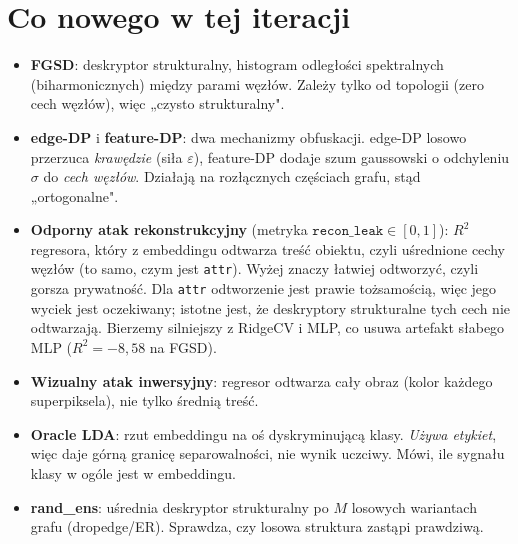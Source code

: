 \documentclass[11pt,a4paper]{article}
\newcommand{\rl}{\texttt{recon\_leak}}
\begin{document}
\section{Co nowego w tej iteracji}
\begin{itemize}
\item \textbf{FGSD}: deskryptor strukturalny, histogram odleg\l o\'sci spektralnych
(biharmonicznych) mi\k{e}dzy parami w\k{e}z\l\'ow. Zale\.zy tylko od topologii (zero cech
w\k{e}z\l\'ow), wi\k{e}c „czysto strukturalny".
\item \textbf{edge-DP} i \textbf{feature-DP}: dwa mechanizmy obfuskacji. edge-DP losowo
przerzuca \emph{kraw\k{e}dzie} (si\l a $\varepsilon$), feature-DP dodaje szum gaussowski o
odchyleniu $\sigma$ do \emph{cech w\k{e}z\l\'ow}. Dzia\l aj\k{a} na roz\l\k{a}cznych cz\k{e}\'sciach
grafu, st\k{a}d „ortogonalne".
\item \textbf{Odporny atak rekonstrukcyjny} (metryka $\rl\in[0,1]$): $R^2$ regresora, kt\'ory
z embeddingu odtwarza tre\'s\'c obiektu, czyli u\'srednione cechy w\k{e}z\l\'ow (to samo, czym
jest \texttt{attr}). Wy\.zej znaczy \l atwiej odtworzy\'c, czyli gorsza prywatno\'s\'c. Dla
\texttt{attr} odtworzenie jest prawie to\.zsamo\'sci\k{a}, wi\k{e}c jego wyciek jest oczekiwany;
istotne jest, \.ze deskryptory strukturalne tych cech nie odtwarzaj\k{a}. Bierzemy silniejszy
z RidgeCV i MLP, co usuwa artefakt s\l abego MLP ($R^2=-8{,}58$ na FGSD).
\item \textbf{Wizualny atak inwersyjny}: regresor odtwarza ca\l y obraz (kolor ka\.zdego
superpiksela), nie tylko \'sredni\k{a} tre\'s\'c.
\item \textbf{Oracle LDA}: rzut embeddingu na o\'s dyskryminuj\k{a}c\k{a} klasy. \emph{U\.zywa
etykiet}, wi\k{e}c daje g\'orn\k{a} granic\k{e} separowalno\'sci, nie wynik uczciwy. M\'owi, ile
sygna\l u klasy w og\'ole jest w embeddingu.
\item \textbf{rand\_ens}: u\'srednia deskryptor strukturalny po $M$ losowych wariantach grafu
(dropedge/ER). Sprawdza, czy losowa struktura zast\k{a}pi prawdziw\k{a}.
\end{itemize}
\end{document}
